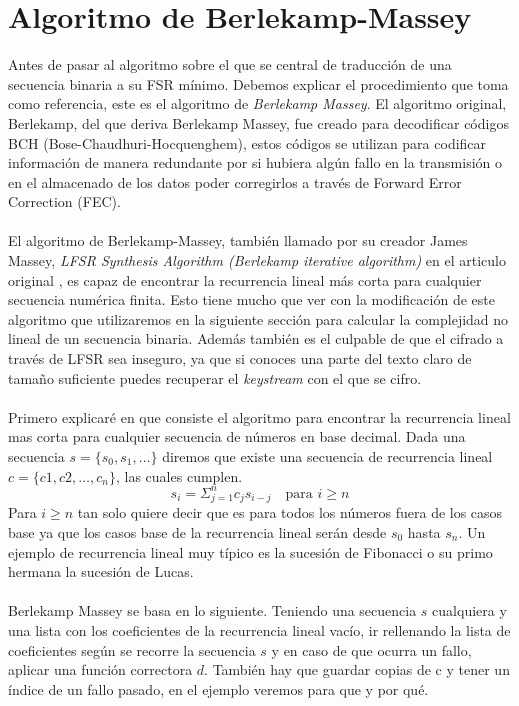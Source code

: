 \section{Algoritmo de Berlekamp-Massey}
Antes de pasar al algoritmo sobre el que se central de traducción de una secuencia binaria a su FSR mínimo. Debemos explicar el procedimiento que toma como referencia, este es el algoritmo de \textit{Berlekamp Massey}. El algoritmo original, Berlekamp, del que deriva Berlekamp Massey, fue creado para decodificar códigos BCH (Bose-Chaudhuri-Hocquenghem), estos códigos se utilizan para codificar información de manera redundante por si hubiera algún fallo en la transmisión o en el almacenado de los datos poder corregirlos a través de Forward Error Correction (FEC). \\\\
El algoritmo de Berlekamp-Massey, también llamado por su creador James Massey, \textit{LFSR Synthesis Algorithm (Berlekamp iterative algorithm)} en el articulo original \cite{massey1969shift}, es capaz de encontrar la recurrencia lineal más corta para cualquier secuencia numérica finita. Esto tiene mucho que ver con la modificación de este algoritmo que utilizaremos en la siguiente sección para calcular la complejidad no lineal de un secuencia binaria. Además también es el culpable de que el cifrado a través de LFSR sea inseguro, ya que si conoces una parte del texto claro de tamaño suficiente puedes recuperar el \textit{keystream} con el que se cifro.\\\\
Primero explicaré en que consiste el algoritmo para encontrar la recurrencia lineal mas corta para cualquier secuencia de números en base decimal. Dada una secuencia $s = \{s_0, s_1, \dots\}$ diremos que existe una secuencia de recurrencia lineal $c = \{c1, c2, \dots, c_n\}$, las cuales cumplen.
\[s_i = \Sigma_{j=1}^n c_js_{i-j} \quad \text{para $i \geq n$}\]
Para $i \geq n$ tan solo quiere decir que es para todos los números fuera de los casos base ya que los casos base de la recurrencia lineal serán desde $s_0$ hasta $s_n$. Un ejemplo de recurrencia lineal muy típico es la sucesión de Fibonacci o su primo hermana la sucesión de Lucas. \\\\
Berlekamp Massey se basa en lo siguiente. Teniendo una secuencia $s$ cualquiera y una lista con los coeficientes de la recurrencia lineal vacío, ir rellenando la lista de coeficientes según se recorre la secuencia $s$ y en caso de que ocurra un fallo, aplicar una función correctora $d$. También hay que guardar copias de c y tener un índice de un fallo pasado, en el ejemplo veremos para que y por qué.\\\\ 

